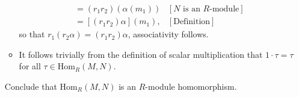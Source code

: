 \documentclass[9pt]{article}
\begin{document}
\begin{enumerate}
\begin{itemize}
\begin{align*}
                     &= (r_1r_2)(\alpha(m_1))
                        &[N \text{ is an } R\text{-module}] \\
                     &= [(r_1r_2)\alpha](m_1), &[\text{Definition}]
               \end{align*}
               so that $r_1(r_2\alpha) = (r_1r_2)\alpha$, associativity follows.
         \item It follows trivially from the definition of scalar multiplication
               that $1 \cdot\tau = \tau$ for all $\tau \in \text{Hom}_R(M, N)$.
      \end{itemize}
      Conclude that $\text{Hom}_R(M, N)$ is an $R$-module homomorphism.
\end{enumerate}
\end{document}
